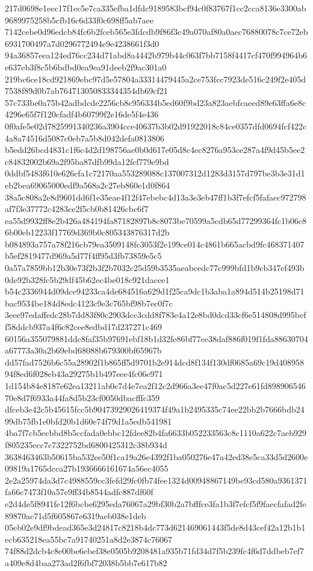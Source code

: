 \documentclass[11pt,a4paper]{article}
\begin{document}
{217d0698e1eec17f1ec5e7ca335efba1dfdc9189583bcf94c0f83767f1cc2cca8136e3300ab9689975258b5cfb16c6d33f0c698ff5ab7aee
7142cebe0d96edcb84fc6b2fceb565e3fdcdb9f86f3c49a070af80a0aec76880078c7ce72eb6931700497a7d0296772494e9e4238661f3d0
94a36857eea124ed76cc234d71abd8a4442b979b44c063f7bb7158f4417cf470f994964b6e637eb3f8c5b6bdbd0ea9ea91deeb2f9ac301a0
219bc6ce18cd921869ebc97d5e57804a33314479445a2ce753fcc7923de516c249f2e405d7538f89d0b7ab764713050833344354db69cf21
57c733be0a75b42adbdcde2256cb8c956334b5ed60f9bd23a823aebfcaeed89e63ffa6e8c4296e65f7f120cfadf4b60799f2e16de5f4e436
0f0afe5e02d7825991340236a3904cce40637b3b02d91922018c84ce0357dfd0694fcf422c4a8a74516d5087c0eb7a5b8d042defa0813806
b5edd26bcd4831c1f6c4d2d198756ae0b0d617e05d8c4ec8276a953ce287a4f9d45b5ee2c84832002b69a2f95ba87dfb99da12fcf779e9bd
0ddbf5483f610e626cfa1c72170aa553289088c137007312d1283d3157d797be3b3e31d1eb2bea69065000edf9a568a2c27eb860e1d0f864
38a5c808a2e8d9601dd6f1e35eae4f12f47ebebc4d13a3e3eb47ff1b3f7efcf5fafaec972798af7f3e37772c4283ce2f5cb0b81426cbc6f7
ea55d9932ff8e2b426a484194fa87182897b8c8073be70599a5cdb65d77299364fc1b06c86b00eb12233f17769d369b0c805343876317d2b
b084893a757a78f216cb79ea3509148fc3053f2e199ce014c4861b665acbd9fc468371407b5ef2819477d969a5d77f4ff95d3fb73859e5c5
0a57a7859bb12b30e73f2b3f2b7032c25d59b3535aeabcedc77c999bfd1b9cb347ef493b0de92b328fc5b29df45b62ec4be018c921dacee1
b54c2336944d09dce94233ca4de684516a629d1f25ca9dc1b3aba1a894d514b25198d71bac9534be184d8edc4123c9e3c765bf98b7ec0f7c
3eee97edaffedc28b7dd83f80c2903dcc3cdd8f783e4a12e8bd0dcd33cf6e514808d995beff58ddcb937a4f6c82cee8edbd17d237271c469
60156a355079881ddc8faf35b97691ebf18b1d32fe86bf77ee38daf886f019f1fda88630704a67773a30a2b69ebd68088b679300bf65967b
dd57fad7526b6c55a28902f1b865ff5d9701b2e914dcd8f134f130df0685a69c19d40895894f8ed6f028eb43a29275b1b497eee4fc06e971
1d154b84e8187e62ea13211ab0e7d4e7ea2f12c2d966a3ee47f0ac5d227e61fd89890654670e8d7f6933a44fa8d5b23cf0050dbacfffc359
dfceb3e42c5b45615fcc5b90473929026419374f49a1b2495335c74ee22bb2b7666bdb2499db75fb1e0bfd20b1d60e74f79d1a5edb541981
4ba7f7cb5ecbbd8b5ccfada0ebbc12fdee82b4fa6633b052233563c8c1110a622c7aeb929f805235ecc7c7322752bd6800425312c38b934d
3638463463b50615ba532ee50f1ca19a26e4392f1ba050276e47a42ed38e5ca33d5d2600e09819a1765dcca27b1936666161674a56ec4055
2e2a25974da3d7c4988559cc3fefd29fc0fb74fee1324d00948867149be93cd580a9361371fa66c7473f10a57e9ff34b8544adfc887df60f
e2d4de5f8941fe12f6bcbe6295eda76067a29bf30b2a7bfffce3fa1b3f7efcf5f9faecfafad2fe89870ac71d5f605867e6319aeb038e1deb
05eb02e9df9bdead365e3d24817c8218b4dc773d621469061443f5de8d43cef42a12b1b1ecb635218ea55bc7a91740251a8d2e3874c76067
74f88d2dcb4c8e00be6ebef38e0505b9208481a935b71fd34d7f5b239fc4f6d7ddbeb7ef7a409e8d4baa273ad2f6fbf72038b5bb7e617b82
}
\end{document}
